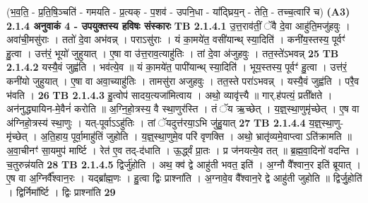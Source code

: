 \documentclass[17pt]{extarticle}
\begin{document}
                  \newline
                                    (भ॒व॒ति॒ - प्र॒ति॒षि॒ञ्चति॑ - गमयति - प्र॒त्यक् - प॒शव॑ - उपनि॒धा - या᳚द्घ्रिय॒न् - तेति॒ - तच्च॒त्वारि॑ च) \textbf{(A3)} \newline \newline
                \textbf{ 2.1.4      अनुवाकं   4 - उपयुक्तस्य हविषः संस्कारः} \newline
                                \textbf{ TB 2.1.4.1} \newline
                  उ॒त्त॒राव॑तीं॒ ॅवै दे॒वा आहु॑ति॒मजु॑हवुः । अवा॑ची॒मसु॑राः । ततो॑ दे॒वा अभ॑वन्न् । पराऽसु॑राः । यं का॒मये॑त॒ वसी॑यान्थ् स्या॒दिति॑ । कनी॑य॒स्तस्य॒ पूर्वꣳ॑ हु॒त्वा । उत्त॑रं॒ भूयो॑ जुहुयात् । ए॒षा वा उ॑त्त॒राव॒त्याहु॑तिः । तां दे॒वा अ॑जुहवुः । तत॒स्ते॑ऽभवन्न् \textbf{ 25} \newline
                  \newline
                                \textbf{ TB 2.1.4.2} \newline
                  यस्यै॒वं जुह्व॑ति । भव॑त्ये॒व ॥ यं का॒मये॑त॒ पापी॑यान्थ् स्या॒दिति॑ । भूय॒स्तस्य॒ पूर्वꣳ॑ हु॒त्वा । उत्त॑रं॒ कनी॑यो जुहुयात् । ए॒षा वा अवा॒च्याहु॑तिः । तामसु॑रा अजुहवुः । तत॒स्ते परा॑ऽभवन्न् । यस्यै॒वं जुह्व॑ति । परै॒व भ॑वति । \textbf{ 26} \newline
                  \newline
                                \textbf{ TB 2.1.4.3} \newline
                  हु॒त्वोप॑ सादय॒त्यजा॑मित्वाय । अथो॒ व्यावृ॑त्त्यै ॥ गार्.ह॑पत्यं॒ प्रती᳚क्षते । अन॑नुद्ध्यायिन-मे॒वैनं॑ करोति ॥ अ॒ग्नि॒हो॒त्रस्य॒ वै स्था॒णुर॑स्ति । तं ॅय ऋ॒च्छेत् । य॒ज्ञ्॒स्था॒णुमृ॑च्छेत् । ए॒ष वा अ॑ग्निहो॒त्रस्य॑ स्था॒णुः । यत्-पूर्वाऽऽहु॑तिः । तां ॅयदुत्त॑रया॒ऽभि जु॑हु॒यात् \textbf{ 27} \newline
                  \newline
                                \textbf{ TB 2.1.4.4} \newline
                  य॒ज्ञ्॒स्था॒णु-मृ॑च्छेत् । अ॒ति॒हाय॒ पूर्वा॒माहु॑तिं जुहोति । य॒ज्ञ्॒स्था॒णुमे॒व परि॑ वृणक्ति । अथो॒ भ्रातृ॑व्यमे॒वाप्त्वा ऽति॑क्रामति ॥ अ॒वा॒चीनꣳ॑ सा॒यमुप॑ मार्ष्टि । रेत॑ ए॒व तद्-द॑धाति । ऊ॒र्द्ध्वं प्रा॒तः । प्र ज॑नयत्ये॒व तत् ॥ ब्र॒ह्म॒वा॒दिनो॑ वदन्ति । च॒तुरुन्न॑यति \textbf{ 28} \newline
                  \newline
                                \textbf{ TB 2.1.4.5} \newline
                  द्विर्जु॑होति । अथ॒ क्व॑ द्वे आहु॑ती भवत॒ इति॑ । अ॒ग्नौ वै᳚श्वान॒र इति॑ ब्रूयात् । ए॒ष वा अ॒ग्निर्वै᳚श्वान॒रः । यद्ब्रा᳚ह्म॒णः । हु॒त्वा द्विः प्राश्ना॑ति । अ॒ग्नावे॒व वै᳚श्वान॒रे द्वे आहु॑ती जुहोति ॥ द्विर्जु॒होति॑ । द्विर्निमा᳚र्ष्टि । द्विः प्राश्ना॑ति \textbf{ 29} \newline
\end{document}
